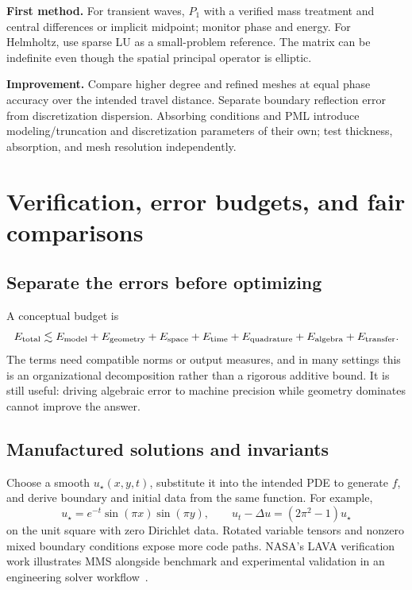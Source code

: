 \documentclass[11pt,a4paper]{article}
\begin{document}
\textbf{First method.} For transient waves, $P_1$ with a verified mass treatment and central differences or implicit midpoint; monitor phase and energy. For Helmholtz, use sparse LU as a small-problem reference. The matrix can be indefinite even though the spatial principal operator is elliptic.

\textbf{Improvement.} Compare higher degree and refined meshes at equal phase accuracy over the intended travel distance. Separate boundary reflection error from discretization dispersion. Absorbing conditions and PML introduce modeling/truncation and discretization parameters of their own; test thickness, absorption, and mesh resolution independently.

\section{Verification, error budgets, and fair comparisons}\label{sec:verification}
\subsection{Separate the errors before optimizing}
A conceptual budget is
\begin{equation}
E_{\rm total}\lesssim E_{\rm model}+E_{\rm geometry}+E_{\rm space}
+E_{\rm time}+E_{\rm quadrature}+E_{\rm algebra}+E_{\rm transfer}.
\end{equation}
The terms need compatible norms or output measures, and in many settings this is an organizational decomposition rather than a rigorous additive bound. It is still useful: driving algebraic error to machine precision while geometry dominates cannot improve the answer.

\subsection{Manufactured solutions and invariants}
Choose a smooth $u_\star(x,y,t)$, substitute it into the intended PDE to generate $f$, and derive boundary and initial data from the same function. For example,
\begin{equation}
u_\star=e^{-t}\sin(\pi x)\sin(\pi y),\qquad
u_t-\Delta u=(2\pi^2-1)u_\star
\end{equation}
on the unit square with zero Dirichlet data. Rotated variable tensors and nonzero mixed boundary conditions expose more code paths. NASA's LAVA verification work illustrates MMS alongside benchmark and experimental validation in an engineering solver workflow~\cite{nasa}.
\end{document}
